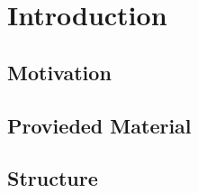 \chapter{Introduction}



\section{Motivation}



\section{Provieded Material}



\section{Structure}


